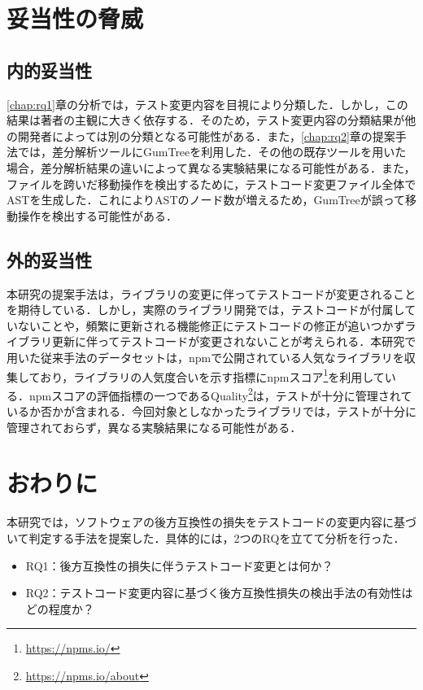 \documentclass[11pt,dvipdfmx]{jreport}
\begin{document}
\chapter{妥当性の脅威}\label{chap:heuristic}
\section{内的妥当性}
\ref{chap:rq1}章の分析では，テスト変更内容を目視により分類した．しかし，この結果は著者の主観に大きく依存する．そのため，テスト変更内容の分類結果が他の開発者によっては別の分類となる可能性がある．また，\ref{chap:rq2}章の提案手法では，差分解析ツールにGumTreeを利用した．その他の既存ツールを用いた場合，差分解析結果の違いによって異なる実験結果になる可能性がある．また，ファイルを跨いだ移動操作を検出するために，テストコード変更ファイル全体でASTを生成した．これによりASTのノード数が増えるため，GumTreeが誤って移動操作を検出する可能性がある．

\section{外的妥当性}
本研究の提案手法は，ライブラリの変更に伴ってテストコードが変更されることを期待している．しかし，実際のライブラリ開発では，テストコードが付属していないことや，頻繁に更新される機能修正にテストコードの修正が追いつかずライブラリ更新に伴ってテストコードが変更されないことが考えられる．本研究で用いた従来手法のデータセットは，npmで公開されている人気なライブラリを収集しており，ライブラリの人気度合いを示す指標にnpmスコア\footnote{\url{https://npms.io/}}を利用している．npmスコアの評価指標の一つであるQuality\footnote{\url{https://npms.io/about}}は，テストが十分に管理されているか否かが含まれる．今回対象としなかったライブラリでは，テストが十分に管理されておらず，異なる実験結果になる可能性がある．

\chapter{おわりに}\label{chap:end}
本研究では，ソフトウェアの後方互換性の損失をテストコードの変更内容に基づいて判定する手法を提案した．具体的には，2つのRQを立てて分析を行った．

\begin{itemize}
  \item RQ1：後方互換性の損失に伴うテストコード変更とは何か？
  \item RQ2：テストコード変更内容に基づく後方互換性損失の検出手法の有効性はどの程度か？
\end{itemize}
\end{document}
